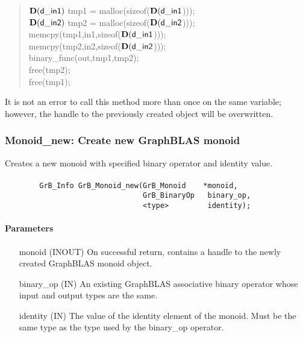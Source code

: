 \begin{quote}
\begin{code}
    $\mathbf{D}({\sf d\_in1})$ tmp1 = malloc(sizeof($\mathbf{D}({\sf d\_in1}$))); \\
    $\mathbf{D}({\sf d\_in2})$ tmp2 = malloc(sizeof($\mathbf{D}({\sf d\_in2}$))); \\
    memcpy(tmp1,in1,sizeof($\mathbf{D}({\sf d\_in1}$))); \\
    memcpy(tmp2,in2,sizeof($\mathbf{D}({\sf d\_in2}$))); \\
    binary\_func(out,tmp1,tmp2); \\
    free(tmp2); \\
    free(tmp1);
\end{code}
\end{quote}

It is not an error to call this method more than once on the same variable;  
however, the handle to the previously created object will be overwritten. 


\subsubsection{{\sf Monoid\_new}: Create new GraphBLAS monoid}

Creates a new monoid with specified binary operator and identity value.

\paragraph{\syntax}

\begin{verbatim}
        GrB_Info GrB_Monoid_new(GrB_Monoid    *monoid,
                                GrB_BinaryOp   binary_op,
                                <type>         identity);
\end{verbatim}

\paragraph{Parameters}

\begin{itemize}[leftmargin=1.1in]
    \item[{\sf monoid}] ({\sf INOUT}) On successful return, contains a
                         handle to the newly created GraphBLAS monoid object.
    \item[{\sf binary\_op}] ({\sf IN}) An existing GraphBLAS associative binary 
                         operator whose input and output types are the same.
    \item[{\sf identity}]  ({\sf IN}) The value of the identity element of the 
                         monoid. Must be the same type as the type used by the
                         {\sf binary\_op} operator.
\end{itemize}

